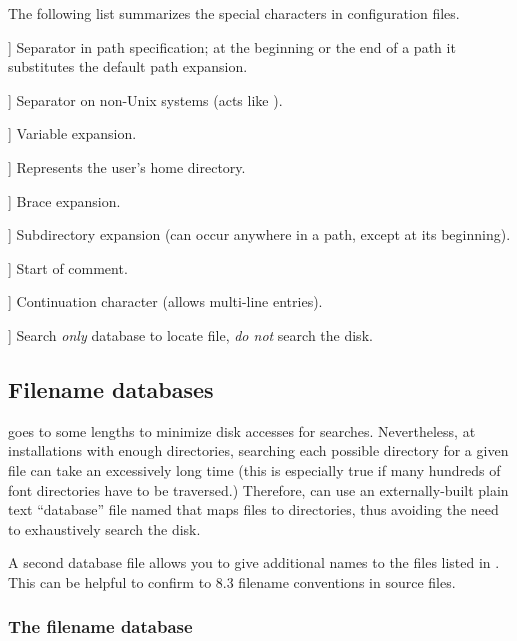 \documentclass{article}
\begin{document}
The following list summarizes the special characters in \KPS{}
configuration files.

\newcommand{\CODE}[1]{\makebox[3em][l]{\code{#1}}}
\begin{ttdescription}
\item[\CODE{:}] Separator in path specification; at the beginning or
  the end of a path it substitutes the default path expansion.\par
\item[\CODE{;}] Separator on non-Unix systems (acts like \code{:}).
\item[\CODE{\$}] Variable expansion.
\item[\CODE{\string~}] Represents the user's home directory. 
\item[\CODE{\char`\{...\char`\}}] Brace expansion.
\item[\CODE{//}] Subdirectory expansion (can occur anywhere in
    a path, except at its beginning).
\item[\CODE{\%}] Start of comment.
\item[\CODE{\bs}] Continuation character (allows multi-line entries).
\item[\CODE{!!}] Search \emph{only} database to locate file, \emph{do
    not} search the disk.
\end{ttdescription}


\subsection{Filename databases}
\label{Filename-database}

\KPS{} goes to some lengths to minimize disk accesses for searches.
Nevertheless, at installations with enough directories, searching each
possible directory for a given file can take an excessively long time
(this is especially true if many hundreds of font directories have to
be traversed.)  Therefore, \KPS{} can use an externally-built plain text
``database'' file named  that maps files to directories,
thus avoiding the need to exhaustively search the disk.

A second database file  allows you to give additional
names to the files listed in .  This can be helpful to
confirm to  8.3 filename conventions in source files.

\subsubsection{The filename database}
\label{ls-R}
\end{document}
